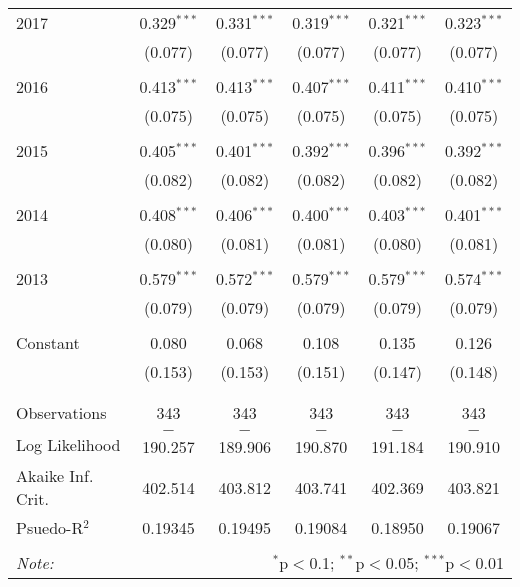 \begin{singlespace}
\begin{table}[H]
\begin{adjustbox}{width=\textwidth, totalheight=\baselineskip}
\begin{tabular}{@{\extracolsep{5pt}}lccccc}
 2017 & 0.329$^{***}$ & 0.331$^{***}$ & 0.319$^{***}$ & 0.321$^{***}$ & 0.323$^{***}$ \\ 
  & (0.077) & (0.077) & (0.077) & (0.077) & (0.077) \\ 
  & & & & & \\ 
 2016 & 0.413$^{***}$ & 0.413$^{***}$ & 0.407$^{***}$ & 0.411$^{***}$ & 0.410$^{***}$ \\ 
  & (0.075) & (0.075) & (0.075) & (0.075) & (0.075) \\ 
  & & & & & \\ 
 2015 & 0.405$^{***}$ & 0.401$^{***}$ & 0.392$^{***}$ & 0.396$^{***}$ & 0.392$^{***}$ \\ 
  & (0.082) & (0.082) & (0.082) & (0.082) & (0.082) \\ 
  & & & & & \\ 
 2014 & 0.408$^{***}$ & 0.406$^{***}$ & 0.400$^{***}$ & 0.403$^{***}$ & 0.401$^{***}$ \\ 
  & (0.080) & (0.081) & (0.081) & (0.080) & (0.081) \\ 
  & & & & & \\ 
 2013 & 0.579$^{***}$ & 0.572$^{***}$ & 0.579$^{***}$ & 0.579$^{***}$ & 0.574$^{***}$ \\ 
  & (0.079) & (0.079) & (0.079) & (0.079) & (0.079) \\ 
  & & & & & \\ 
 Constant & 0.080 & 0.068 & 0.108 & 0.135 & 0.126 \\ 
  & (0.153) & (0.153) & (0.151) & (0.147) & (0.148) \\ 
  & & & & & \\ 
\hline \\[-1.8ex] 
Observations & 343 & 343 & 343 & 343 & 343 \\ 
Log Likelihood & $-$190.257 & $-$189.906 & $-$190.870 & $-$191.184 & $-$190.910 \\ 
Akaike Inf. Crit. & 402.514 & 403.812 & 403.741 & 402.369 & 403.821 \\ 
Psuedo-R$^{2}$ & 0.19345 & 0.19495 & 0.19084 & 0.18950 & 0.19067 \\
\hline 
\hline \\[-1.8ex] 
\textit{Note:}  & \multicolumn{5}{r}{$^{*}$p$<$0.1; $^{**}$p$<$0.05; $^{***}$p$<$0.01} \\ 
\end{tabular}
\end{adjustbox} 
\end{table} 
\end{singlespace}
  
